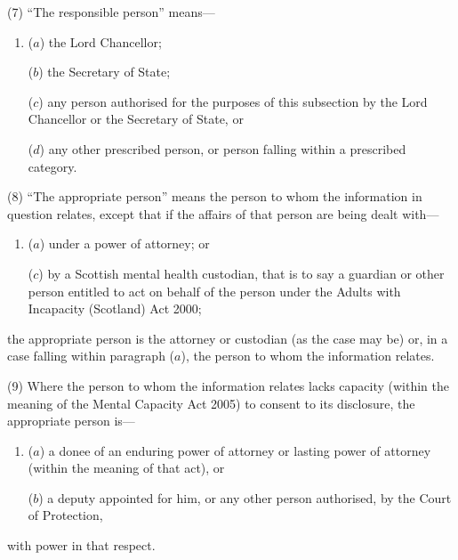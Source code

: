 \documentclass[a4paper]{article}
\begin{document}
(7) “The responsible person” means---
\begin{enumerate}\item[]
($a$) the Lord Chancellor;

($b$) the Secretary of State;

($c$) any person authorised for the purposes of this subsection by the Lord
Chancellor or the Secretary of State, or

($d$) any other prescribed person, or person falling within a prescribed
category.
\end{enumerate}

(8) “The appropriate person” means the person to whom the information in question relates, except that if the affairs of that person are being dealt with---
\begin{enumerate}\item[]
($a$) under a power of attorney; or

($c$) by a Scottish mental health custodian, that is to say a guardian or other person entitled to act on behalf of the person under the Adults with Incapacity (Scotland) Act 2000;
\end{enumerate}
the appropriate person is the attorney or custodian (as the case may be) or, in a case falling within paragraph ($a$), the person to whom the information relates.

(9) Where the person to whom the information relates lacks capacity (within the
meaning of the Mental Capacity Act 2005) to consent to its disclosure, the appropriate
person is---
\begin{enumerate}\item[]
($a$) a donee of an enduring power of attorney or lasting power of attorney (within the meaning of that act), or

($b$) a deputy appointed for him, or any other person authorised, by the Court of
Protection,
\end{enumerate}
with power in that respect.
\end{document}
